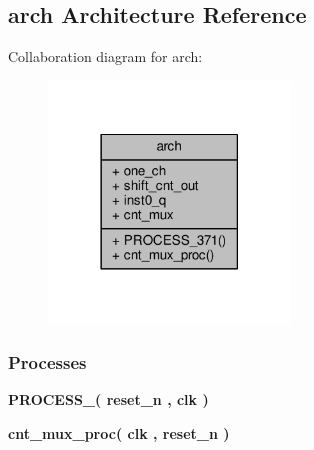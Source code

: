 \subsection{arch Architecture Reference}
\label{classsmpl__cnt_1_1arch}


Collaboration diagram for arch\+:\nopagebreak
\begin{figure}[H]
\begin{center}
\leavevmode
\includegraphics[width=182pt]{d7/d63/classsmpl__cnt_1_1arch__coll__graph}
\end{center}
\end{figure}
\subsubsection*{Processes}
 \begin{DoxyCompactItemize}
\item 
{\bf P\+R\+O\+C\+E\+S\+S\+\_}{\bfseries  ( {\bfseries {\bfseries {\bf reset\+\_\+n}} \textcolor{vhdlchar}{ }} , {\bfseries {\bfseries {\bf clk}} \textcolor{vhdlchar}{ }} )}
\item 
{\bf cnt\+\_\+mux\+\_\+proc}{\bfseries  ( {\bfseries {\bfseries {\bf clk}} \textcolor{vhdlchar}{ }} , {\bfseries {\bfseries {\bf reset\+\_\+n}} \textcolor{vhdlchar}{ }} )}
\end{DoxyCompactItemize}
